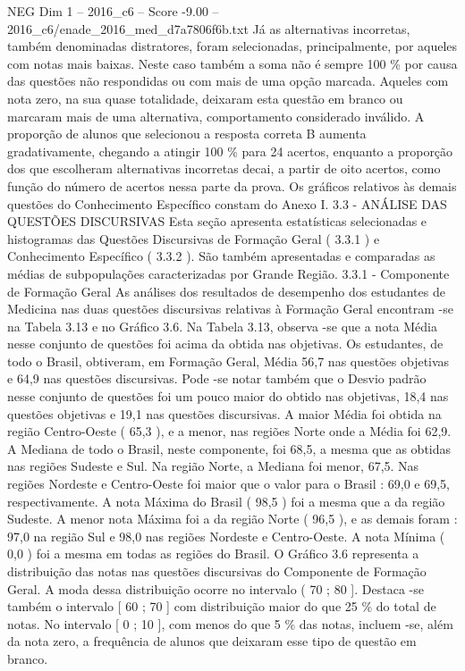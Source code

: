 \begin{textsample}{NEG Dim 1 – 2016\_c6 – Score -9.00 – 2016\_c6/enade\_2016\_med\_d7a7806f6b.txt}
Já as alternativas incorretas, também denominadas distratores, foram selecionadas, principalmente, por aqueles com notas mais baixas.
Neste caso também a soma não é sempre 100 \% por causa das questões não respondidas ou com mais de uma opção marcada.
Aqueles com nota zero, na sua quase totalidade, deixaram esta questão em branco ou marcaram mais de uma alternativa, comportamento considerado inválido.
A proporção de alunos que selecionou a resposta correta B aumenta gradativamente, chegando a atingir 100 \% para 24 acertos, enquanto a proporção dos que escolheram alternativas incorretas decai, a partir de oito acertos, como função do número de acertos nessa parte da prova.
Os gráficos relativos às demais questões do Conhecimento Específico constam do Anexo I. 3.3 - ANÁLISE DAS QUESTÕES DISCURSIVAS Esta seção apresenta estatísticas selecionadas e histogramas das Questões Discursivas de Formação Geral ( 3.3.1 ) e Conhecimento Específico ( 3.3.2 ).
São também apresentadas e comparadas as médias de subpopulações caracterizadas por Grande Região. 3.3.1 - Componente de Formação Geral As análises dos resultados de desempenho dos estudantes de Medicina nas duas questões discursivas relativas à Formação Geral encontram -se na Tabela 3.13 e no Gráfico 3.6.
Na Tabela 3.13, observa -se que a nota Média nesse conjunto de questões foi acima da obtida nas objetivas.
Os estudantes, de todo o Brasil, obtiveram, em Formação Geral, Média 56,7 nas questões objetivas e 64,9 nas questões discursivas.
Pode -se notar também que o Desvio padrão nesse conjunto de questões foi um pouco maior do obtido nas objetivas, 18,4 nas questões objetivas e 19,1 nas questões discursivas.
A maior Média foi obtida na região Centro-Oeste ( 65,3 ), e a menor, nas regiões Norte onde a Média foi 62,9.
A Mediana de todo o Brasil, neste componente, foi 68,5, a mesma que as obtidas nas regiões Sudeste e Sul.
Na região Norte, a Mediana foi menor, 67,5.
Nas regiões Nordeste e Centro-Oeste foi maior que o valor para o Brasil : 69,0 e 69,5, respectivamente.
A nota Máxima do Brasil ( 98,5 ) foi a mesma que a da região Sudeste.
A menor nota Máxima foi a da região Norte ( 96,5 ), e as demais foram : 97,0 na região Sul e 98,0 nas regiões Nordeste e Centro-Oeste.
A nota Mínima ( 0,0 ) foi a mesma em todas as regiões do Brasil.
O Gráfico 3.6 representa a distribuição das notas nas questões discursivas do Componente de Formação Geral.
A moda dessa distribuição ocorre no intervalo ( 70 ; 80 ].
Destaca -se também o intervalo [ 60 ; 70 ] com distribuição maior do que 25 \% do total de notas.
No intervalo [ 0 ; 10 ], com menos do que 5 \% das notas, incluem -se, além da nota zero, a frequência de alunos que deixaram esse tipo de questão em branco.

\end{textsample}
